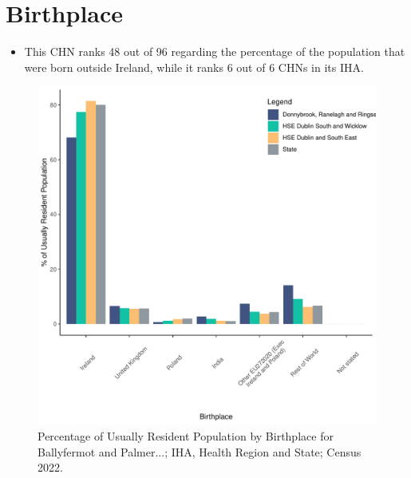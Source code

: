 \documentclass{article}
\begin{document}
\section{Birthplace}\label{sect:Birth}
\begin{itemize}
\item This CHN ranks  48 out of 96 regarding the percentage of the population that were born outside Ireland, while it ranks  6 out of 6 CHNs in its IHA.
\end{itemize}
\begin{figure}[H]
	\centering
	\includegraphics[width = 130mm]{../figures/BirthED.pdf}
	\caption{Percentage of Usually Resident Population by Birthplace for Ballyfermot and Palmer...; IHA, Health Region and State; Census 2022.}
	\label{fig:vbnv}
	\end{figure}
	
\end{document}
